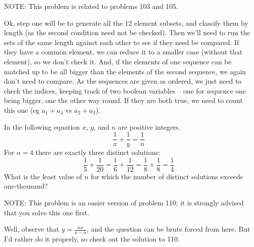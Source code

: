 \footnotesize
NOTE: This problem is related to problems 103 and 105.

\normalsize
{}
Ok, step one will be to generate all the 12 element subsets, and classify them by length (as the second condition need not be checked).  Then we'll need to run the sets of the same length against each other to see if they need be compared.  If they have a common element, we can reduce it to a smaller case (without that element), so we don't check it.  And, if the elements of one sequence can be matched up to be all bigger than the elements of the second sequence, we again don't need to compare.  As the sequences are given as ordered, we just need to check the indices, keeping track of two boolean variables -- one for sequence one being bigger, one the other way round.  If they are both true, we need to count this one (eg $a_1+a_4$ vs $a_2+a_3$).






\ans{---}



In the following equation $x$, $y$, and $n$ are positive integers.
$$ \frac 1x + \frac 1y = \frac 1n$$
For $n = 4$ there are exactly three distinct solutions:
$$\frac 15 + \frac1{20} = \frac 16 + \frac{1}{12} = \frac 18 + \frac 18 = \frac 14$$
What is the least value of $n$ for which the number of distinct solutions exceeds one-thousand?

\footnotesize
NOTE: This problem is an easier version of problem 110; it is strongly advised that you solve this one first.
\normalsize

Well, observe that $y = \tfrac {nx}{x-n}$, and the question can be brute forced from here.  But I'd rather do it properly,
so check out the solution to 110.




